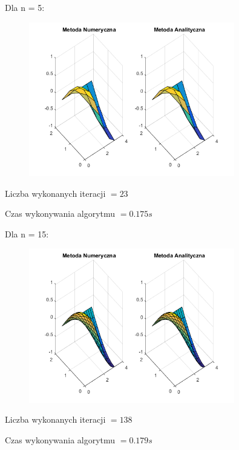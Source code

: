 Dla n = 5:

\begin{figure}[!ht]
	\begin{center}
		\includegraphics[width=0.8\textwidth]{Lab6/charts/jacobi/zad2/5.png}
	\end{center}
\end{figure}

Liczba wykonanych iteracji $ = 23 $

Czas wykonywania algorytmu $ = 0.175 s$

Dla n = 15:

\begin{figure}[!ht]
	\begin{center}
		\includegraphics[width=0.8\textwidth]{Lab6/charts/jacobi/zad2/15.png}
	\end{center}
\end{figure}

Liczba wykonanych iteracji $ = 138 $

Czas wykonywania algorytmu $ = 0.179 s$

